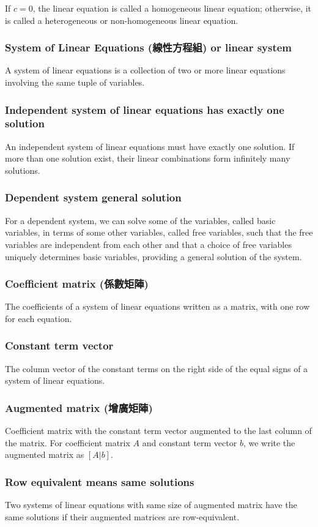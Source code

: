 \documentclass[a4paper,12pt]{report}
\begin{document}
If $c=0$, the linear equation is called a homogeneous linear equation; otherwise, it is called a heterogeneous or non-homogeneous linear equation.
\subsubsection{System of Linear Equations (線性方程組) or linear system}
A system of linear equations is a collection of two or more linear equations involving the same tuple of variables.
\subsubsection{Independent system of linear equations has exactly one solution}
An independent system of linear equations must have exactly one solution.
\bpr
If more than one solution exist, their linear combinations form infinitely many solutions.
\epr
\subsubsection{Dependent system general solution}
For a dependent system, we can solve some of the variables, called basic variables, in terms of some other variables, called free variables, such that the free variables are independent from each other and that a choice of free variables uniquely determines basic variables, providing a general solution of the system.
\subsubsection{Coefficient matrix (係數矩陣)}
The coefficients of a system of linear equations written as a matrix, with one row for each equation.
\subsubsection{Constant term vector}
The column vector of the constant terms on the right side of the equal signs of a system of linear equations.
\subsubsection{Augmented matrix (增廣矩陣)}
Coefficient matrix with the constant term vector augmented to the last column of the matrix. For coefficient matrix $A$ and constant term vector $b$, we write the augmented matrix as $[A|b]$.
\subsubsection{Row equivalent means same solutions}
Two systems of linear equations with same size of augmented matrix have the same solutions if their augmented matrices are row-equivalent.
\end{document}
